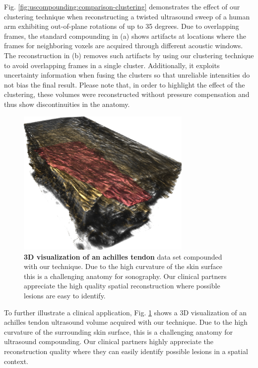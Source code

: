 Fig. \ref{fig:uscompounding:comparison-clustering} demonstrates the effect of our clustering technique when reconstructing a twisted ultrasound sweep of a human arm exhibiting out-of-plane rotations of up to 35 degrees.
Due to overlapping frames, the standard compounding in (a) shows artifacts at locations where the frames for neighboring voxels are acquired through different acoustic windows.
The reconstruction in (b) removes such artifacts by using our clustering technique to avoid overlapping frames in a single cluster. 
Additionally, it exploits uncertainty information when fusing the clusters so that unreliable intensities do not bias the final result.
Please note that, in order to highlight the effect of the clustering, these volumes were reconstructed without  pressure compensation and thus show discontinuities in the anatomy.

\begin{figure}[ht]
	\centering
	\includegraphics[width=0.75\textwidth]{figures/uscompounding/achilles_3d.jpg}
	
	\caption{
			\textbf{3D visualization of an achilles tendon} data set compounded with our technique.
			Due to the high curvature of the skin surface this is a challenging anatomy for sonography.
			Our clinical partners appreciate the high quality spatial reconstruction where possible lesions are easy to identify.
	}
	\label{fig:uscompounding:achilles-3d}
\end{figure}

To further illustrate a clinical application, Fig. \ref{fig:uscompounding:achilles-3d} shows a 3D visualization of an achilles tendon ultrasound volume acquired with our technique.
Due to the high curvature of the surrounding skin surface, this is a challenging anatomy for ultrasound compounding.
Our clinical partners highly appreciate the reconstruction quality where they can easily identify possible lesions in a spatial context.

